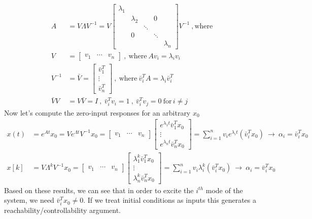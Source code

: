 \documentclass[twoside]{article}
\begin{document}
\begin{align*}
    A &= V \Lambda V^{-1} = V \begin{bmatrix} \lambda_1 & & & & \\ & \lambda_2 & & 0 & \\ & & \ddots & & \\ & 0 & & \ddots & \\ & & & & \lambda_n \end{bmatrix} V^{-1} \ , \mathrm{where}
    \\[1ex]
     V &= \begin{bmatrix} v_1 & \cdots & v_n \end{bmatrix} \ , \ \mathrm{where} \ A v_i = \lambda_i v_i 
 \\[1ex]
 V^{-1} &= \bar{V} =  \begin{bmatrix} \bar{v}_1^T \\ \vdots \\ \bar{v}_n^T \end{bmatrix} \ , \ \mathrm{where} \ \bar{v}_i^T A = \lambda_i \bar{v}_i^T
  \\[1ex]
\bar{V} V &= V \bar{V} = I \ , \ \bar{v}_i^T v_i = 1 \ , \  \bar{v}_i^T v_j = 0 \ \mathrm{for} \, i \neq j
\end{align*}
%
Now let's compute the zero-input responses for an arbitrary $x_0$
%
\begin{align*}
    x(t) &= e^{A t} x_0 = V e^{\Lambda t} V^{-1} x_0 = \begin{bmatrix} v_1 & \cdots & v_n \end{bmatrix} 
    \begin{bmatrix} e^{\lambda_1 t} \bar{v}_1^T x_0 \\  \vdots \\ e^{\lambda_n t} \bar{v}_n^T x_0 \end{bmatrix} 
    = \sum\limits_{i=1}^n v_i e^{\lambda_i t} \left( \bar{v}_i^T x_0 \right) \ \rightarrow \ \alpha_i = \bar{v}_i^T x_0
       \\[1ex]
    x[k] &= V \Lambda^k V^{-1} x_0 = \begin{bmatrix} v_1 & \cdots & v_n \end{bmatrix} 
    \begin{bmatrix} \lambda_1^k \bar{v}_1^T x_0 \\  \vdots \\ \lambda_n^k \bar{v}_n^T x_0 \end{bmatrix} 
    = \sum\limits_{i=1}^n v_i \lambda_i^k \left( \bar{v}_i^T x_0 \right) \ \rightarrow \ \alpha_i = \bar{v}_i^T x_0
\end{align*}
%
Based on these results, we can see that in order to excite the $i^{th}$ mode of the system, we need $\bar{v}_i^T x_0 \neq 0$. If we treat initial conditions 
as inputs this generates a reachability/controllability argument. 
\end{document}
